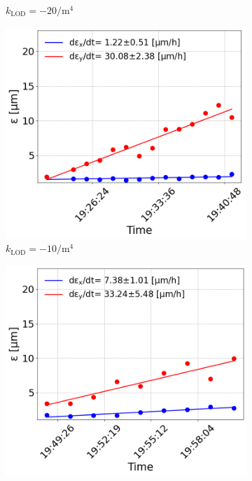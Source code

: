 \begin{figure}[htp]
\begin{subfigure}{.4\textwidth}
        \caption{$k_\mathrm{LOD}=-20 \mathrm{/m^{4}}$}
    \end{subfigure}
    \begin{subfigure}{.4\textwidth}
        \centering
        \includegraphics[width=.95\linewidth]{images/app_c/cc_md_12sep22_coast8.png}  
        \caption{$k_\mathrm{LOD}=-10  \mathrm{/m^{4}}$}
    \end{subfigure}
    \begin{subfigure}{.4\textwidth}
            \centering
            \includegraphics[width=.95\linewidth]{images/app_c/cc_md_12sep22_coast9.png}  

\end{subfigure}
\end{figure}
